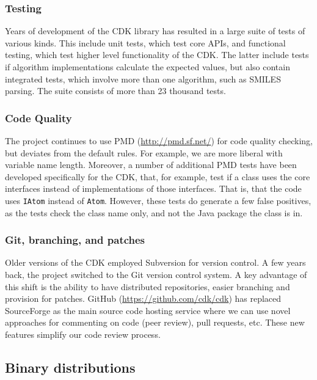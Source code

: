 \documentclass[doublespacing]{bmcart}
\begin{document}
\subsubsection*{Testing}

Years of development of the CDK library has resulted in a large suite of
tests of various kinds. This include unit tests, which test core APIs, and
functional testing, which test higher level functionality of the CDK. The
latter include tests if algorithm implementations calculate the expected
values, but also contain integrated tests, which involve more than one
algorithm, such as SMILES parsing. The suite consists of more than 23 thousand
tests.

\subsubsection*{Code Quality}

The project continues to use PMD (\url{http://pmd.sf.net/}) for code quality checking,
but deviates from the default rules. For example, we are more liberal with 
variable name length. Moreover, a number of additional PMD tests have been
developed specifically for the CDK, that, for example, test if a class uses
the core interfaces instead of implementations of those interfaces. That is,
that the code uses \texttt{IAtom} instead of \texttt{Atom}. However, these tests do generate a
few false positives, as the tests check the class name only, and not the
Java package the class is in.

\subsubsection*{Git, branching, and patches}

Older versions of the CDK employed Subversion for version control. A
few years back, the project switched to the Git version control
system. A key advantage of this shift is the ability to have
distributed repositories, easier branching and provision for
patches. GitHub (\url{https://github.com/cdk/cdk}) has replaced
SourceForge as the main source code hosting service where we can use
novel approaches for commenting on code (peer review), pull requests,
etc. These new features simplify our code review process.

\subsection*{Binary distributions}
\end{document}
